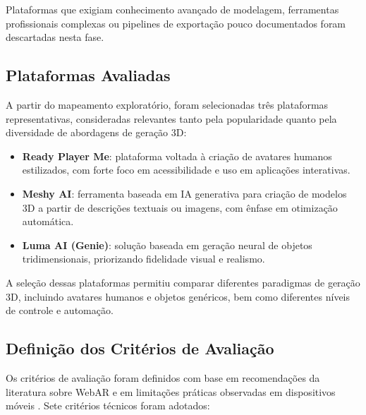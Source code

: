\documentclass[conference]{IEEEtran}
\begin{document}
Plataformas que exigiam conhecimento avançado de modelagem, ferramentas profissionais complexas ou pipelines de exportação pouco documentados foram descartadas nesta fase.

\subsection{Plataformas Avaliadas}

A partir do mapeamento exploratório, foram selecionadas três plataformas representativas, consideradas relevantes tanto pela popularidade quanto pela diversidade de abordagens de geração 3D:

\begin{itemize}
    \item \textbf{Ready Player Me}: plataforma voltada à criação de avatares humanos estilizados, com forte foco em acessibilidade e uso em aplicações interativas.
    \item \textbf{Meshy AI}: ferramenta baseada em IA generativa para criação de modelos 3D a partir de descrições textuais ou imagens, com ênfase em otimização automática.
    \item \textbf{Luma AI (Genie)}: solução baseada em geração neural de objetos tridimensionais, priorizando fidelidade visual e realismo.
\end{itemize}

A seleção dessas plataformas permitiu comparar diferentes paradigmas de geração 3D, incluindo avatares humanos e objetos genéricos, bem como diferentes níveis de controle e automação.

\subsection{Definição dos Critérios de Avaliação}

Os critérios de avaliação foram definidos com base em recomendações da literatura sobre WebAR e em limitações práticas observadas em dispositivos móveis \cite{koutsabasis2021webar, ruiz2020arbeginner}. Sete critérios técnicos foram adotados:
\end{document}
